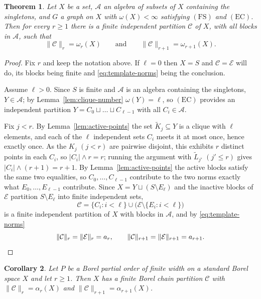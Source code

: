 \documentclass[11pt,reqno]{amsart}
\theoremstyle{plain}
\newtheorem{theorem}{Theorem}[section]
\newtheorem{corollary}[theorem]{Corollary}
\theoremstyle{definition}
\theoremstyle{remark}
\newcommand{\cl}{\omega}
\begin{document}
\begin{theorem}
\label{thm:main-saturation}
Let $X$ be a set, $\mathcal A$ an algebra of subsets of $X$ containing the
singletons, and $G$ a graph on $X$ with $\cl(X)<\infty$ satisfying
$\mathrm{(FS)}$ and $\mathrm{(EC)}$. Then for every $r\ge1$ there is a finite
independent partition $\mathcal C$ of $X$, with all blocks in $\mathcal A$,
such that
\[
\lVert\mathcal C\rVert_r=\cl_r(X)
\qquad\text{and}\qquad
\lVert\mathcal C\rVert_{r+1}=\cl_{r+1}(X).
\]
\end{theorem}

\begin{proof}
Fix $r$ and keep the notation above. If $\ell=0$ then $X=S$ and
$\mathcal C=\mathcal E$ will do, its blocks being finite and
\eqref{eq:template-norms} being the conclusion.

Assume $\ell>0$. Since $S$ is finite and $\mathcal A$ is an algebra containing
the singletons, $Y\in\mathcal A$; by Lemma~\ref{lem:clique-number}
$\cl(Y)=\ell$, so $\mathrm{(EC)}$ provides an independent partition
$Y=C_0\sqcup\dots\sqcup C_{\ell-1}$ with all $C_i\in\mathcal A$.

Fix $j<r$. By Lemma~\ref{lem:active-points} the set $\widetilde K_j\subseteq Y$
is a clique with $\ell$ elements, and each of the $\ell$ independent sets
$C_i$ meets it at most once, hence exactly once. As the $K_j$ $(j<r)$ are
pairwise disjoint, this exhibits $r$ distinct points in each $C_i$, so
$|C_i|\wedge r=r$; running the argument with $\widetilde L_{j'}$ $(j'\le r)$
gives $|C_i|\wedge(r+1)=r+1$. By Lemma~\ref{lem:active-points} the active
blocks satisfy the same two equalities, so $C_0,\dots,C_{\ell-1}$ contribute to
the two norms exactly what $E_0,\dots,E_{\ell-1}$ contribute. Since
$X=Y\sqcup(S\setminus E_{\ell})$ and the inactive blocks of $\mathcal E$
partition $S\setminus E_{\ell}$ into finite independent sets,
\[
\mathcal C=\{C_i:i<\ell\}\cup\bigl(\mathcal E\setminus\{E_i:i<\ell\}\bigr)
\]
is a finite independent partition of $X$ with blocks in $\mathcal A$, and by
\eqref{eq:template-norms}
\[
\lVert\mathcal C\rVert_r=\lVert\mathcal E\rVert_r=a_r,
\qquad
\lVert\mathcal C\rVert_{r+1}=\lVert\mathcal E\rVert_{r+1}=a_{r+1}.
\qedhere
\]
\end{proof}

\begin{corollary}
\label{cor:borel-chain}
Let $P$ be a Borel partial order of finite width on a standard Borel space $X$
and let $r\ge1$. Then $X$ has a finite Borel chain partition $\mathcal C$ with
$\lVert\mathcal C\rVert_r=\alpha_r(X)$ and
$\lVert\mathcal C\rVert_{r+1}=\alpha_{r+1}(X)$.
\end{corollary}
\end{document}
